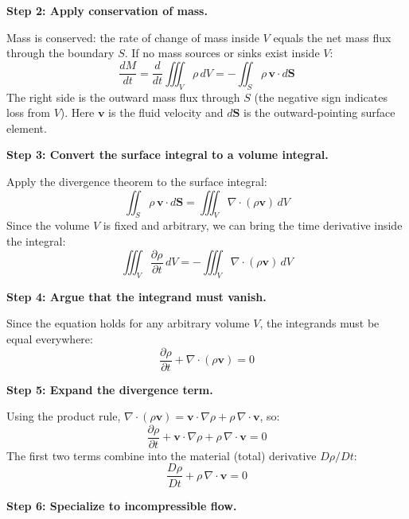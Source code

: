 \textbf{Step 2: Apply conservation of mass.}

Mass is conserved: the rate of change of mass inside $V$ equals the net mass flux through the boundary $S$. If no mass sources or sinks exist inside $V$:
\begin{equation}
\frac{dM}{dt} = \frac{d}{dt}\iiint_V \rho\, dV = -\iint_S \rho\,\mathbf{v} \cdot d\mathbf{S}
\end{equation}
The right side is the outward mass flux through $S$ (the negative sign indicates loss from $V$). Here $\mathbf{v}$ is the fluid velocity and $d\mathbf{S}$ is the outward-pointing surface element.

\textbf{Step 3: Convert the surface integral to a volume integral.}

Apply the divergence theorem to the surface integral:
\begin{equation}
\iint_S \rho\,\mathbf{v} \cdot d\mathbf{S} = \iiint_V \nabla \cdot (\rho\mathbf{v})\, dV
\end{equation}
Since the volume $V$ is fixed and arbitrary, we can bring the time derivative inside the integral:
\begin{equation}
\iiint_V \frac{\partial \rho}{\partial t}\, dV = -\iiint_V \nabla \cdot (\rho\mathbf{v})\, dV
\end{equation}

\textbf{Step 4: Argue that the integrand must vanish.}

Since the equation holds for any arbitrary volume $V$, the integrands must be equal everywhere:
\begin{equation}
\frac{\partial \rho}{\partial t} + \nabla \cdot (\rho\mathbf{v}) = 0
\end{equation}

\textbf{Step 5: Expand the divergence term.}

Using the product rule, $\nabla \cdot (\rho\mathbf{v}) = \mathbf{v} \cdot \nabla\rho + \rho\,\nabla \cdot \mathbf{v}$, so:
\begin{equation}
\frac{\partial \rho}{\partial t} + \mathbf{v} \cdot \nabla\rho + \rho\,\nabla \cdot \mathbf{v} = 0
\end{equation}
The first two terms combine into the material (total) derivative $D\rho/Dt$:
\begin{equation}
\frac{D\rho}{Dt} + \rho\,\nabla \cdot \mathbf{v} = 0
\end{equation}

\textbf{Step 6: Specialize to incompressible flow.}

